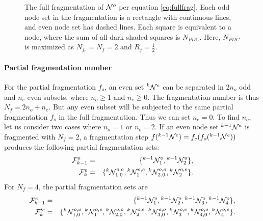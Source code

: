 \begin{figure}
  \caption{The full fragmentation of $\mathcal{N}^o$ per equation \eqref{eq:fullfrag}. Each odd node set in the fragmentation is a rectangle with continuous lines, and even node set has dashed lines. Each square is equivalent to a node, where the sum of all dark shaded squares is $N_{PDC}$. Here, $N_{PDC}$ is maximized as $N_{f_e} = N_{f} = 2$ and $R_j = \frac{1}{2}$. }\label{fig:fragcorrect}
\end{figure}

\paragraph{Partial fragmentation number}
For the partial fragmentation $f_o$, an even set ${}^{k}\mathcal{N}^e$ can be separated in $2n_o$ odd and $n_e$ even subsets, where $n_o\geq 1$ and $n_e \geq 0$. The fragmentation number is thus $N_f = 2n_o + n_e$. But any even subset will be subjected to the same partial fragmentation $f_o$ in the full fragmentation. Thus we can set $n_e=0$. To find $n_o$, let us consider two cases where $n_o = 1$ or $n_o=2$. If an even node set ${}^{k-1}\mathcal{N}^e$ is fragmented with $N_{f}=2$, a fragmentation step $f({}^{k-1}\mathcal{N}^e)=f_e(f_o({}^{k-1}\mathcal{N}^e))$ produces the following partial fragmentation sets:
\begin{eqnarray*}
  \mathcal{F}^o_{k-1} &=& \{ {}^{k-1} \mathcal{N}^{o}_1, {}^{k-1} \mathcal{N}^{o}_2\},  \\
  \mathcal{F}^e_{k} &=& \{{}^{k}\mathcal{N}^{o,o}_{1,0}, {}^{k}\mathcal{N}^{o,e}_1, {}^{k}\mathcal{N}^{o,o}_{2,0}, {}^{k}\mathcal{N}^{o,e}_2 \}.
\end{eqnarray*}
For $N_{f} = 4$, the partial fragmentation sets are
\begin{eqnarray*}
  \mathcal{F}^e_{k-1} &=& \{ {}^{k-1}\mathcal{N}^{o}_1, {}^{k-1}\mathcal{N}^{o}_2,  {}^{k-1}\mathcal{N}^{o}_3, {}^{k-1}\mathcal{N}^{o}_4\},  \\
  \mathcal{F}'^e_{k} &=& \{{}^{k}\mathcal{N}^{o,o}_{1,0}, {}^{k}\mathcal{N}^{o,e}_1,  {}^{k}\mathcal{N}^{o,o}_{2,0}, {}^{k}\mathcal{N}^{o,e}_2,  {}^{k}\mathcal{N}^{o,o}_{3,0}, {}^{k}\mathcal{N}^{o,e}_3, {}^{k}\mathcal{N}^{o,o}_{4,0}, {}^{k}\mathcal{N}^{o,e}_4 \}.
\end{eqnarray*}

